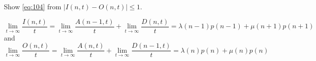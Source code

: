 \documentclass[queueing-book.tex]{subfiles}
\begin{document}
\begin{exercise}\label{ex:79}
Show \cref{eq:104} from  $|I(n,t)-O(n,t)|\leq 1$.
\begin{solution}
\begin{equation*}
\lim_{t\to\infty} \frac{I(n,t)}t = \lim_{t\to\infty} \frac{A(n-1,t)}t + \lim_{t\to\infty} \frac{D(n,t)}t = \lambda(n-1) p(n-1) +
\mu(n+1) p(n+1)
\end{equation*}
and
\begin{equation*}
\lim_{t\to\infty} \frac{O(n,t)}t = \lim_{t\to\infty} \frac{A(n,t)}t + \lim_{t\to\infty} \frac{D(n-1,t)}t = \lambda(n) p(n) +
\mu(n) p(n)
\end{equation*}
\end{solution}
\end{exercise}


\end{document}
